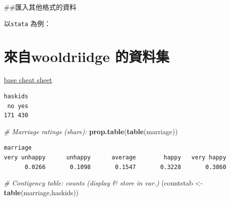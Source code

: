 \documentclass[]{book}
\newenvironment{Shaded}{\begin{snugshade}}{\end{snugshade}}
\newcommand{\CommentTok}[1]{\textcolor[rgb]{0.56,0.35,0.01}{\textit{#1}}}
\newcommand{\DataTypeTok}[1]{\textcolor[rgb]{0.13,0.29,0.53}{#1}}
\newcommand{\KeywordTok}[1]{\textcolor[rgb]{0.13,0.29,0.53}{\textbf{#1}}}
\newcommand{\NormalTok}[1]{#1}
\newcommand{\OperatorTok}[1]{\textcolor[rgb]{0.81,0.36,0.00}{\textbf{#1}}}
\newcommand{\StringTok}[1]{\textcolor[rgb]{0.31,0.60,0.02}{#1}}
\theoremstyle{definition}
\theoremstyle{definition}
\theoremstyle{definition}
\theoremstyle{remark}
\begin{document}
\#\#匯入其他格式的資料

以\texttt{stata} 為例：

\hypertarget{wooldriidge-}{%
\section{來自wooldriidge 的資料集}\label{wooldriidge-}}

\href{https://www.povertyactionlab.org/sites/default/files/r-cheat-sheet.pdf}{base
cheat sheet}

\begin{Shaded}
\end{Shaded}

\begin{verbatim}
haskids
 no yes 
171 430 
\end{verbatim}

\begin{Shaded}
\begin{Highlighting}[]
\CommentTok{# Marriage ratings (share):}
\KeywordTok{prop.table}\NormalTok{(}\KeywordTok{table}\NormalTok{(marriage))}
\end{Highlighting}
\end{Shaded}

\begin{verbatim}
marriage
very unhappy      unhappy      average        happy   very happy 
      0.0266       0.1098       0.1547       0.3228       0.3860 
\end{verbatim}

\begin{Shaded}
\begin{Highlighting}[]
\CommentTok{# Contigency table: counts (display & store in var.)}
\NormalTok{(countstab <-}\StringTok{ }\KeywordTok{table}\NormalTok{(marriage,haskids))}
\end{Highlighting}
\end{Shaded}
\end{document}
